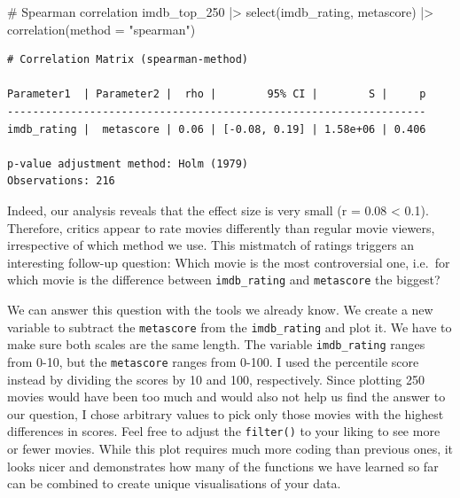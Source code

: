 \documentclass[
  letterpaper,
]{krantz}
\makeatletter
\newenvironment{Shaded}{\begin{snugshade}}{\end{snugshade}}
\newcommand{\AttributeTok}[1]{\textcolor[rgb]{0.40,0.45,0.13}{#1}}
\newcommand{\CommentTok}[1]{\textcolor[rgb]{0.37,0.37,0.37}{#1}}
\newcommand{\FunctionTok}[1]{\textcolor[rgb]{0.28,0.35,0.67}{#1}}
\newcommand{\NormalTok}[1]{\textcolor[rgb]{0.00,0.23,0.31}{#1}}
\newcommand{\SpecialCharTok}[1]{\textcolor[rgb]{0.37,0.37,0.37}{#1}}
\newcommand{\StringTok}[1]{\textcolor[rgb]{0.13,0.47,0.30}{#1}}
\newenvironment{kframe}{%
\medskip{}
\setlength{\fboxsep}{.8em}
 \def\at@end@of@kframe{}%
 \ifinner\ifhmode%
  \def\at@end@of@kframe{\end{minipage}}%
  \begin{minipage}{\columnwidth}%
 \fi\fi%
 \def\FrameCommand##1{\hskip\@totalleftmargin \hskip-\fboxsep
 \colorbox{shadecolor}{##1}\hskip-\fboxsep
     \hskip-\linewidth \hskip-\@totalleftmargin \hskip\columnwidth}%
 \MakeFramed {\advance\hsize-\width
   \@totalleftmargin\z@ \linewidth\hsize
   \@setminipage}}%
 {\par\unskip\endMakeFramed%
 \at@end@of@kframe}
\renewenvironment{Shaded}{\begin{kframe}}{\end{kframe}}
\makeatother
\begin{document}
\begin{Shaded}
\begin{Highlighting}[]
\CommentTok{\# Spearman correlation}
\NormalTok{imdb\_top\_250 }\SpecialCharTok{|\textgreater{}}
  \FunctionTok{select}\NormalTok{(imdb\_rating, metascore) }\SpecialCharTok{|\textgreater{}}
  \FunctionTok{correlation}\NormalTok{(}\AttributeTok{method =} \StringTok{"spearman"}\NormalTok{)}
\end{Highlighting}
\end{Shaded}

\begin{verbatim}
# Correlation Matrix (spearman-method)

Parameter1  | Parameter2 |  rho |        95% CI |        S |     p
------------------------------------------------------------------
imdb_rating |  metascore | 0.06 | [-0.08, 0.19] | 1.58e+06 | 0.406

p-value adjustment method: Holm (1979)
Observations: 216
\end{verbatim}

Indeed, our analysis reveals that the effect size is very small (r =
0.08 \textless{} 0.1). Therefore, critics appear to rate movies
differently than regular movie viewers, irrespective of which method we
use. This mistmatch of ratings triggers an interesting follow-up
question: Which movie is the most controversial one, i.e.~for which
movie is the difference between \texttt{imdb\_rating} and
\texttt{metascore} the biggest?

We can answer this question with the tools we already know. We create a
new variable to subtract the \texttt{metascore} from the
\texttt{imdb\_rating} and plot it. We have to make sure both scales are
the same length. The variable \texttt{imdb\_rating} ranges from 0-10,
but the \texttt{metascore} ranges from 0-100. I used the percentile
score instead by dividing the scores by 10 and 100, respectively. Since
plotting 250 movies would have been too much and would also not help us
find the answer to our question, I chose arbitrary values to pick only
those movies with the highest differences in scores. Feel free to adjust
the \texttt{filter()} to your liking to see more or fewer movies. While
this plot requires much more coding than previous ones, it looks nicer
and demonstrates how many of the functions we have learned so far can be
combined to create unique visualisations of your data.
\end{document}
